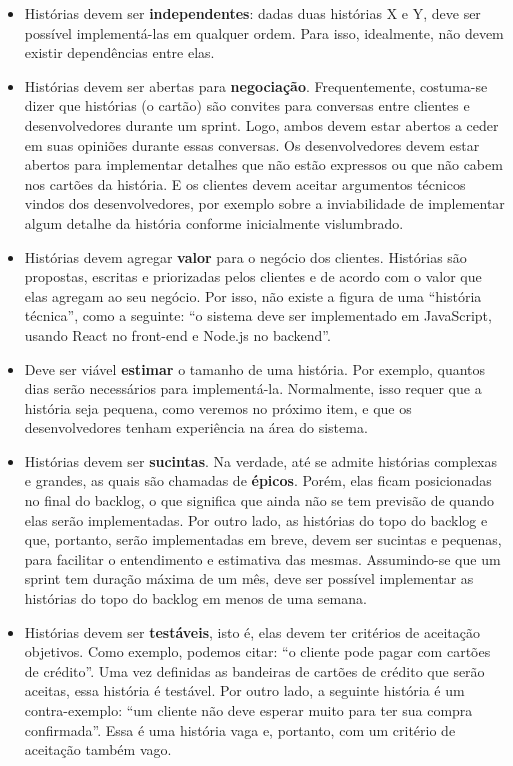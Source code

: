 \documentclass[
  11pt,
  twoside]{book}
\begin{document}
\begin{itemize}
\item
  Histórias devem ser \textbf{independentes}: dadas duas histórias X e
  Y, deve ser possível implementá-las em qualquer ordem. Para isso,
  idealmente, não devem existir dependências entre elas.
\item
  Histórias devem ser abertas para \textbf{negociação}. Frequentemente,
  costuma-se dizer que histórias (o cartão) são convites para conversas
  entre clientes e desenvolvedores durante um sprint. Logo, ambos devem
  estar abertos a ceder em suas opiniões durante essas conversas. Os
  desenvolvedores devem estar abertos para implementar detalhes que não
  estão expressos ou que não cabem nos cartões da história. E os
  clientes devem aceitar argumentos técnicos vindos dos desenvolvedores,
  por exemplo sobre a inviabilidade de implementar algum detalhe da
  história conforme inicialmente vislumbrado.
\item
  Histórias devem agregar \textbf{valor} para o negócio dos clientes.
  Histórias são propostas, escritas e priorizadas pelos clientes e de
  acordo com o valor que elas agregam ao seu negócio. Por isso, não
  existe a figura de uma ``história técnica'', como a seguinte: ``o
  sistema deve ser implementado em JavaScript, usando React no front-end
  e Node.js no backend''.
\item
  Deve ser viável \textbf{estimar} o tamanho de uma história. Por
  exemplo, quantos dias serão necessários para implementá-la.
  Normalmente, isso requer que a história seja pequena, como veremos no
  próximo item, e que os desenvolvedores tenham experiência na área do
  sistema.
\item
  Histórias devem ser \textbf{sucintas}. Na verdade, até se admite
  histórias complexas e grandes, as quais são chamadas de
  \textbf{épicos}. Porém, elas ficam posicionadas no final do backlog, o
  que significa que ainda não se tem previsão de quando elas serão
  implementadas. Por outro lado, as histórias do topo do backlog e que,
  portanto, serão implementadas em breve, devem ser sucintas e pequenas,
  para facilitar o entendimento e estimativa das mesmas. Assumindo-se
  que um sprint tem duração máxima de um mês, deve ser possível
  implementar as histórias do topo do backlog em menos de uma semana.
\item
  Histórias devem ser \textbf{testáveis}, isto é, elas devem ter
  critérios de aceitação objetivos. Como exemplo, podemos citar: ``o
  cliente pode pagar com cartões de crédito''. Uma vez definidas as
  bandeiras de cartões de crédito que serão aceitas, essa história é
  testável. Por outro lado, a seguinte história é um contra-exemplo:
  ``um cliente não deve esperar muito para ter sua compra confirmada''.
  Essa é uma história vaga e, portanto, com um critério de aceitação
  também vago.
\end{itemize}
\end{document}
